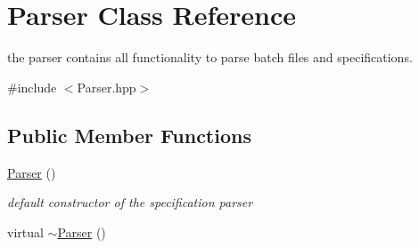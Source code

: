 \hypertarget{classParser}{}\section{Parser Class Reference}
\label{classParser}


the parser contains all functionality to parse batch files and specifications.  




{\ttfamily \#include $<$Parser.\+hpp$>$}

\subsection*{Public Member Functions}
\begin{DoxyCompactItemize}
\item 
\hyperlink{classParser_a12234f6cd36b61af4b50c94a179422c1}{Parser} ()\hypertarget{classParser_a12234f6cd36b61af4b50c94a179422c1}{}\label{classParser_a12234f6cd36b61af4b50c94a179422c1}

\begin{DoxyCompactList}\small\item\em default constructor of the specification parser \end{DoxyCompactList}\item 
virtual \hyperlink{classParser_a3e658b5917a93a3ef648050d060e3a93}{$\sim$\+Parser} ()\hypertarget{classParser_a3e658b5917a93a3ef648050d060e3a93}{}\label{classParser_a3e658b5917a93a3ef648050d060e3a93}


\end{DoxyCompactItemize}

